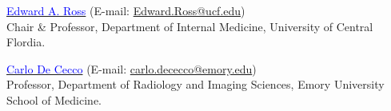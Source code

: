 \documentclass[margin, line]{res}
\newenvironment{list1}{
  \begin{list}{\ding{113}}{%
      \setlength{\itemsep}{0in}
      \setlength{\parsep}{0in} \setlength{\parskip}{0in}
      \setlength{\topsep}{0in} \setlength{\partopsep}{0in} 
      \setlength{\leftmargin}{0.17in}}}{\end{list}}
\begin{document}
\begin{resume}
\begin{list1}
\item[] \href{https://med.ucf.edu/person/edward-ross-m-d/}{{\textcolor{blue}{Edward A. Ross}}} (E-mail: \href{mailto:thamlin@tcfd.org}{Edward.Ross@ucf.edu}) \\Chair \& Professor, Department of Internal Medicine, University of Central Flordia.






\item[] \href{https://med.emory.edu/directory/profile/?u=CDECECC}{{\textcolor{blue}{Carlo De Cecco}}} (E-mail: \href{mailto:carlo.dececco@emory.edu
}{carlo.dececco@emory.edu})\\
Professor, Department of Radiology and Imaging Sciences, Emory University School of Medicine.


\end{list1}
\end{resume}
\end{document}
